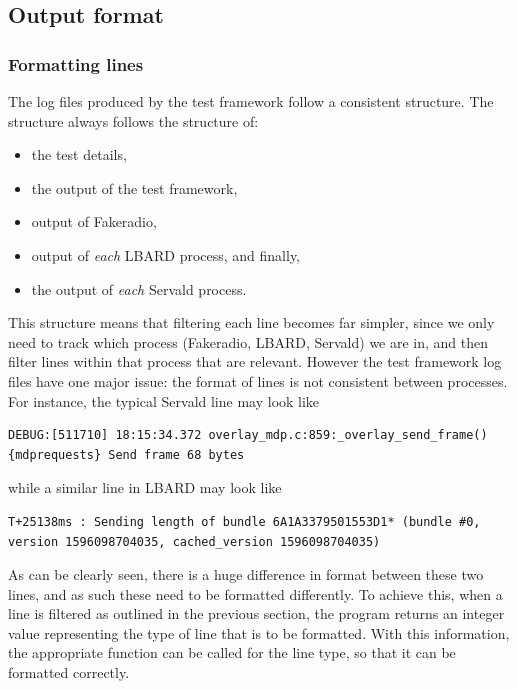 \subsection{Output format}

\subsubsection{Formatting lines}
The log files produced by the test framework follow a consistent structure.
The structure always follows the structure of:
\begin{itemize}
    \item the test details, 
    \item the output of the test framework, 
    \item output of Fakeradio, 
    \item output of \emph{each} LBARD process, and finally,
    \item the output of \emph{each} Servald process.
\end{itemize} 

This structure means that filtering each line becomes far simpler, since we only need to track which process (Fakeradio, LBARD, Servald) we are in, and then filter lines within that process that are relevant.
However the test framework log files have one major issue: the format of lines is not consistent between processes.
For instance, the typical Servald line may look like
\begin{center}
    \begin{lstlisting}[basicstyle=\small, breaklines]
DEBUG:[511710] 18:15:34.372 overlay_mdp.c:859:_overlay_send_frame() {mdprequests} Send frame 68 bytes    
    \end{lstlisting}
\end{center}
while a similar line in LBARD may look like 

\begin{center}
    \begin{lstlisting}[basicstyle=\small, breaklines]
T+25138ms : Sending length of bundle 6A1A3379501553D1* (bundle #0, version 1596098704035, cached_version 1596098704035)
    \end{lstlisting}
\end{center}


As can be clearly seen, there is a huge difference in format between these two lines, and as such these need to be formatted differently.
To achieve this, when a line is filtered as outlined in the previous section, the program returns an integer value representing the type of line that is to be formatted.
With this information, the appropriate function can be called for the line type, so that it can be formatted correctly.

